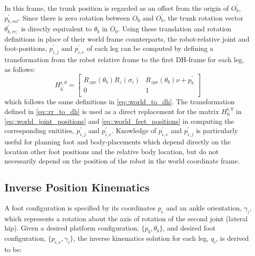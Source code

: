 			In this frame, the trunk position is regarded as an offset from the origin of $O_{b}^{'}$, $p_{b,rel}^{'}$. Since there is zero rotation between $O_{0}$ and $O_{b}^{'}$, the trunk rotation vector $\theta_{b,re;}^{'}$ is directly equivalent to $\theta_{b}$ in $O_{0}$. Using these translation and rotation definitions in place of their world frame counterparts, the robot-relative joint and foot-positions, ${p}_{i,j}^{'}$ and ${p}_{i,e}^{'}$ of each \Ith leg can be computed by defining a transformation from the robot relative frame to the first DH-frame for each leg, as follows:
				\begin{equation}
					H_{b^{'}}^{i,0} = 
					\left[ 
					\begin{array}{c|c}
						R_{zyx}(\theta_{b}) R_{z}(\sigma_{i})	&R_{zyx}(\theta_{b}) \nu + {p}_{b}^{'} 	\\ \hline
						0										&	1												\\
					\end{array} 
					\right]
					\label{eq::rr_to_dh}
				\end{equation}
			which follows the same definitions in \ref{eq::world_to_dh}.
			The transformation defined in \ref{eq::rr_to_dh} is used as a direct replacement for the matrix $H_{0}^{i,0}$ in \ref{eq::world_joint_positions} and \ref{eq::world_feet_positions} in computing the corresponding enitities, ${p}_{i,j}^{'}$ and ${p}_{i,e}^{'}$. Knowledge of ${p}_{i,e}^{'}$ and ${p}_{i,j}^{'}$ is particularly useful for planning foot and body-placements which depend directly on the location other foot positions and the relative body location, but do not necessarily depend on the position of the robot in the world coordinate frame.
 



		\subsection{Inverse Position Kinematics}

			A foot configuration is specified by its coordinates ${p}_{e}$ and an ankle orientation, $\gamma_{i}$,  which represents a rotation about the axis of rotation of the second joint (lateral hip). Given a desired platform configuration, $\{ {p}_{b}, \theta_{b} \}$,  and desired \Ith foot configuration,  $\{ {p}_{i,e} , \gamma_{i} \}$, the inverse kinematics solution for each \Ith leg, ${q}_{i}$, is derived to be:

